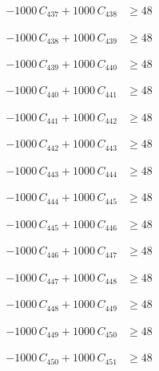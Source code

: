 \documentclass[a4paper,11pt]{article}
\begin{document}
\begin{align}
-1000\,C_{437} + 1000\,C_{438} &\geq 48 \nonumber
\end{align}

\begin{align}
-1000\,C_{438} + 1000\,C_{439} &\geq 48 \nonumber
\end{align}

\begin{align}
-1000\,C_{439} + 1000\,C_{440} &\geq 48 \nonumber
\end{align}

\begin{align}
-1000\,C_{440} + 1000\,C_{441} &\geq 48 \nonumber
\end{align}

\begin{align}
-1000\,C_{441} + 1000\,C_{442} &\geq 48 \nonumber
\end{align}

\begin{align}
-1000\,C_{442} + 1000\,C_{443} &\geq 48 \nonumber
\end{align}

\begin{align}
-1000\,C_{443} + 1000\,C_{444} &\geq 48 \nonumber
\end{align}

\begin{align}
-1000\,C_{444} + 1000\,C_{445} &\geq 48 \nonumber
\end{align}

\begin{align}
-1000\,C_{445} + 1000\,C_{446} &\geq 48 \nonumber
\end{align}

\begin{align}
-1000\,C_{446} + 1000\,C_{447} &\geq 48 \nonumber
\end{align}

\begin{align}
-1000\,C_{447} + 1000\,C_{448} &\geq 48 \nonumber
\end{align}

\begin{align}
-1000\,C_{448} + 1000\,C_{449} &\geq 48 \nonumber
\end{align}

\begin{align}
-1000\,C_{449} + 1000\,C_{450} &\geq 48 \nonumber
\end{align}

\begin{align}
-1000\,C_{450} + 1000\,C_{451} &\geq 48 \nonumber
\end{align}
\end{document}

